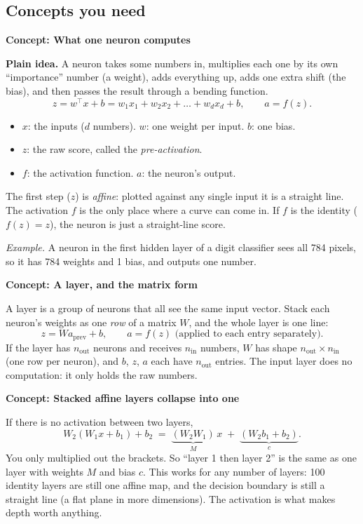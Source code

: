 \documentclass[12pt,a4paper]{article}
\newcommand{\concept}[2]{\par\medskip\phantomsection\label{#1}{\large\bfseries\color{blue!50!black} Concept: #2}\par}
\begin{document}
\subsection*{Concepts you need}

\concept{c:neuron}{What one neuron computes}
\textbf{Plain idea.} A neuron takes some numbers in, multiplies each one by its own ``importance'' number (a weight), adds everything up, adds one extra shift (the bias), and then passes the result through a bending function.
\[
z = w^\top x + b = w_1x_1 + w_2x_2 + \dots + w_dx_d + b, \qquad a = f(z).
\]
\begin{itemize}[nosep]
\item $x$: the inputs ($d$ numbers). $w$: one weight per input. $b$: one bias.
\item $z$: the raw score, called the \emph{pre-activation}.
\item $f$: the activation function. $a$: the neuron's output.
\end{itemize}
The first step ($z$) is \emph{affine}: plotted against any single input it is a straight line. The activation $f$ is the only place where a curve can come in. If $f$ is the identity ($f(z)=z$), the neuron is just a straight-line score.

\emph{Example.} A neuron in the first hidden layer of a digit classifier sees all 784 pixels, so it has 784 weights and 1 bias, and outputs one number.

\concept{c:layer}{A layer, and the matrix form}
A layer is a group of neurons that all see the same input vector. Stack each neuron's weights as one \emph{row} of a matrix $W$, and the whole layer is one line:
\[
z = W a_{\text{prev}} + b, \qquad a = f(z) \text{ (applied to each entry separately).}
\]
If the layer has $n_{\text{out}}$ neurons and receives $n_{\text{in}}$ numbers, $W$ has shape $n_{\text{out}}\times n_{\text{in}}$ (one row per neuron), and $b$, $z$, $a$ each have $n_{\text{out}}$ entries. The input layer does no computation: it only holds the raw numbers.

\concept{c:collapse}{Stacked affine layers collapse into one}
If there is no activation between two layers,
\[
W_2(W_1x+b_1)+b_2 \;=\; \underbrace{(W_2W_1)}_{M}\,x \;+\; \underbrace{(W_2b_1+b_2)}_{c}.
\]
You only multiplied out the brackets. So ``layer 1 then layer 2'' is the same as one layer with weights $M$ and bias $c$. This works for any number of layers: 100 identity layers are still one affine map, and the decision boundary is still a straight line (a flat plane in more dimensions). The activation is what makes depth worth anything.
\end{document}
